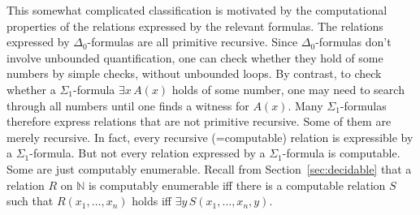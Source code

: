 This somewhat complicated classification is motivated by
the computational properties of the relations expressed by the relevant formulas.
The relations expressed by $\Delta_{0}$-formulas are all primitive recursive.
Since $\Delta_{0}$-formulas don't involve unbounded quantification,
one can check whether they hold of some numbers by simple checks,
without unbounded loops.
By contrast,
to check whether a $\Sigma_{1}$-formula $\exists x \, A(x)$ holds of some number,
one may need to search through all numbers
until one finds a witness for $A(x)$.
Many $\Sigma_{1}$-formulas therefore express relations that are not primitive recursive.
Some of them are merely recursive.
In fact, every recursive (=computable) relation is expressible by a $\Sigma_{1}$-formula.
But not every relation expressed by a $\Sigma_{1}$-formula is computable.
Some are just computably enumerable.
Recall from Section~\ref{sec:decidable}
that a relation $R$ on $\mathbb{N}$ is computably enumerable
iff there is a computable relation $S$
such that $R(x_1,\ldots,x_n)$ holds iff $\exists y \, S(x_1,\ldots,x_n,y)$.

